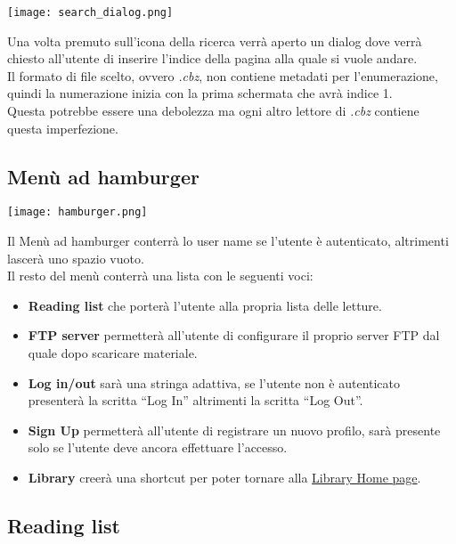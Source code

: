 \documentclass[../Assignment-3-LPSMT.tex]{subfiles}
\begin{document}
\begin{center}
   \texttt{[image: search\_dialog.png]}
\end{center}

Una volta premuto sull'icona della ricerca verrà aperto un dialog dove verrà chiesto all'utente di inserire l'indice della pagina alla quale si vuole andare.\\
Il formato di file scelto, ovvero \emph{.cbz}, non contiene metadati per l'enumerazione, quindi la numerazione inizia con la prima schermata che avrà indice 1.\\
Questa potrebbe essere una debolezza ma ogni altro lettore di \emph{.cbz} contiene questa imperfezione.

\subsection{Menù ad hamburger}\label{sec:hamburger}

\begin{center}
   \texttt{[image: hamburger.png]}
\end{center}

Il Menù ad hamburger conterrà lo user name se l'utente è autenticato, altrimenti lascerà uno spazio vuoto.\\
Il resto del menù conterrà una lista con le seguenti voci:
\begin{itemize}
   \item \textbf{Reading list} che porterà l'utente alla propria lista delle letture.
   \item \textbf{FTP server} permetterà all'utente di configurare il proprio server FTP dal quale dopo scaricare materiale.
   \item \textbf{Log in/out} sarà una stringa adattiva, se l'utente non è autenticato presenterà la scritta ``Log In'' altrimenti la scritta ``Log Out''.
  \item \textbf{Sign Up} permetterà all'utente di registrare un nuovo profilo, sarà presente solo se l'utente deve ancora effettuare l'accesso.
  \item \textbf{Library} creerà una shortcut per poter tornare alla \hyperref[sec:home]{Library \- Home page}.
\end{itemize}

\subsection{Reading list}\label{sec:reading_list}
\end{document}
